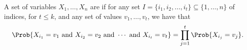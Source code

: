 \begin{defn}
    A set of variables $X_1, \ldots, X_n$ are  if for any set $I = \{i_1, i_2, \ldots, i_t\} \subseteq \{1,\ldots,n\}$ of
    indices, for $t \leq k$, and any set of values $v_1, \ldots, v_t$,
    we have that
    \begin{equation*}
        \Prob{
           X_{i_1} = v_1 \text{ and }
           X_{i_2} = v_2 \text{ and } \cdots \text{ and }
           X_{i_t} = v_t}%
        =%
        \prod_{j=1}^t
        \Prob{X_{i_j} = v_j}.
    \end{equation*}
\end{defn}
